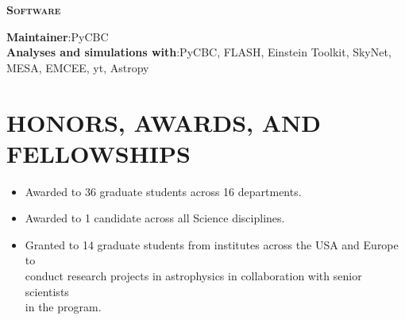 \textsc{\textbf{Software}}
\begin{addmargin}[2em]{2em}
{\textbf{Maintainer}:\hspace{1.5ex}}{PyCBC} \\
{\textbf{Analyses and simulations with}:\hspace{1.5ex}}{PyCBC, FLASH, Einstein Toolkit, SkyNet, MESA, EMCEE, yt, Astropy}
\end{addmargin}
\vspace{2mm}
\fi 

\section{HONORS, AWARDS, AND FELLOWSHIPS}
\vspace{1mm}
{
{
\begin{itemize}
\renewcommand{\labelitemi}{-}
    \item Awarded to 36 graduate students across 16 departments.
\end{itemize}}}

\vspace{1mm}
{
{
\begin{itemize}
\renewcommand{\labelitemi}{-}
    \item Awarded to 1 candidate across all Science disciplines.
\end{itemize}}}

\vspace{1mm}
{
{
\begin{itemize}
\renewcommand{\labelitemi}{-}
    \item Granted to 14 graduate students from institutes across the USA and Europe to \\ conduct research projects in astrophysics in collaboration with senior scientists \\ in the program.
\end{itemize}}}

